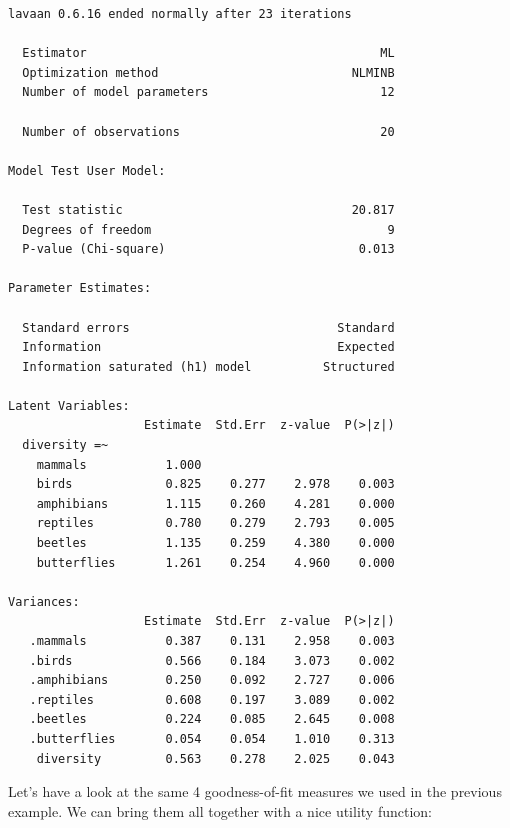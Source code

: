 \documentclass[
  letterpaper,
  DIV=11,
  numbers=noendperiod]{scrreprt}
\begin{document}
\begin{verbatim}
lavaan 0.6.16 ended normally after 23 iterations

  Estimator                                         ML
  Optimization method                           NLMINB
  Number of model parameters                        12

  Number of observations                            20

Model Test User Model:
                                                      
  Test statistic                                20.817
  Degrees of freedom                                 9
  P-value (Chi-square)                           0.013

Parameter Estimates:

  Standard errors                             Standard
  Information                                 Expected
  Information saturated (h1) model          Structured

Latent Variables:
                   Estimate  Std.Err  z-value  P(>|z|)
  diversity =~                                        
    mammals           1.000                           
    birds             0.825    0.277    2.978    0.003
    amphibians        1.115    0.260    4.281    0.000
    reptiles          0.780    0.279    2.793    0.005
    beetles           1.135    0.259    4.380    0.000
    butterflies       1.261    0.254    4.960    0.000

Variances:
                   Estimate  Std.Err  z-value  P(>|z|)
   .mammals           0.387    0.131    2.958    0.003
   .birds             0.566    0.184    3.073    0.002
   .amphibians        0.250    0.092    2.727    0.006
   .reptiles          0.608    0.197    3.089    0.002
   .beetles           0.224    0.085    2.645    0.008
   .butterflies       0.054    0.054    1.010    0.313
    diversity         0.563    0.278    2.025    0.043
\end{verbatim}

Let's have a look at the same 4 goodness-of-fit measures we used in the
previous example. We can bring them all together with a nice utility
function:
\end{document}
